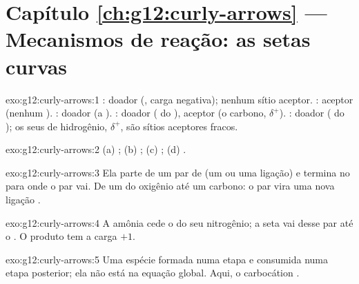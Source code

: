 \section*{Capítulo \ref{ch:g12:curly-arrows} --- Mecanismos de reação: as setas curvas}

\begin{solution}{exo:g12:curly-arrows:1}
: doador (, carga negativa); nenhum sítio
aceptor. : aceptor (nenhum ). : doador (a
). : doador ( do ),
aceptor (o carbono, $\delta^+$). : doador ( do
); os seus  de hidrogênio, $\delta^+$, são sítios aceptores
fracos.
\end{solution}

\begin{solution}{exo:g12:curly-arrows:2}
(a) ; (b) ; (c) ; (d) .
\end{solution}

\begin{solution}{exo:g12:curly-arrows:3}
Ela parte de um par de  (um  ou uma ligação) e
termina no  para onde o par vai. De um  do oxigênio
até um carbono: o par vira uma nova ligação .
\end{solution}

\begin{solution}{exo:g12:curly-arrows:4}
A amônia cede o  do seu nitrogênio; a seta vai desse par
até o . O produto  tem a carga $+1$.
\end{solution}

\begin{solution}{exo:g12:curly-arrows:5}
Uma espécie formada numa etapa e consumida numa etapa posterior; ela não
está na equação global. Aqui, o carbocátion .
\end{solution}

